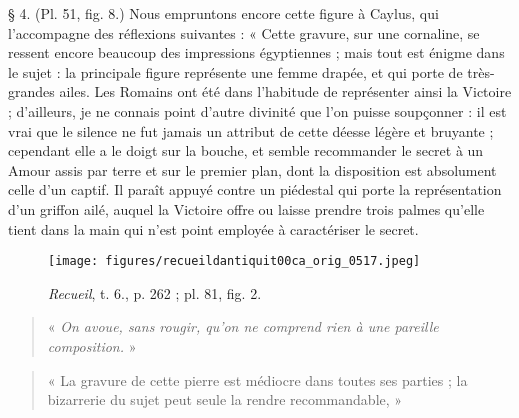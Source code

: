 \documentclass[a4paper, 11pt, oneside, polutonikogreek, french]{article}
\begin{document}
§ 4. (Pl. 51, fig. 8.) Nous empruntons encore cette figure à Caylus, qui l'accompagne des réflexions suivantes : « Cette gravure, sur une cornaline, se ressent encore beaucoup des impressions égyptiennes ; mais tout est énigme dans le sujet : la principale figure représente une femme drapée, et qui porte de très-grandes ailes. Les Romains ont été dans l'habitude de représenter ainsi la Victoire ; d'ailleurs, je ne connais point d'autre divinité que l'on puisse soupçonner : il est vrai que le silence ne fut jamais un attribut de cette déesse légère et bruyante ; cependant elle a le doigt sur la bouche, et semble recommander le secret à un Amour assis par terre et sur le premier plan, dont la disposition est absolument celle d'un captif. Il paraît appuyé contre un piédestal qui porte la représentation d'un griffon ailé, auquel la Victoire offre ou laisse prendre trois palmes qu'elle tient dans la main qui n'est point employée à caractériser le secret.

\begin{figure}[H]
\centering
\texttt{[image: figures/recueildantiquit00ca\_orig\_0517.jpeg]}
\caption{\emph{Recueil}, t. 6., p. 262 ; pl. 81, fig. 2.}
\end{figure}
\begin{quotation}
\small
« \emph{On avoue, sans rougir, qu'on ne comprend rien à une pareille composition.} »

\end{quotation}
\begin{quotation}
\small
« La gravure de cette pierre est médiocre dans toutes ses parties ; la bizarrerie du sujet peut seule la rendre recommandable, »

\end{quotation}
\end{document}

